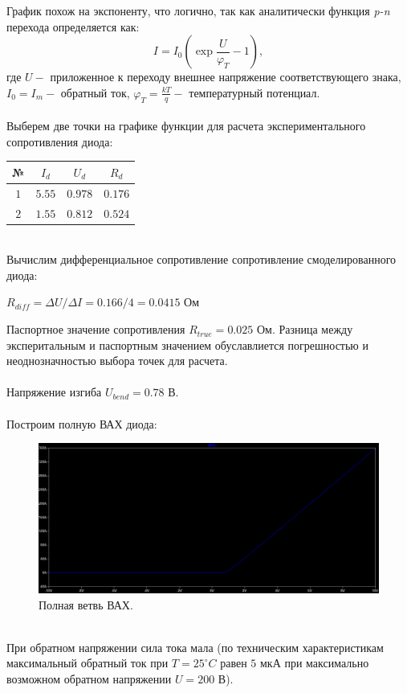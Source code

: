\documentclass[12pt]{article}
\begin{document}
График похож на экспоненту, что логично, так как аналитически функция \emph{p-n} перехода определяется как:
\[
I = I_0(\exp{\frac{U}{\varphi_T}} - 1),
\]
где $U - $ приложенное к переходу внешнее напряжение соответствующего знака, $I_0 = I_m - $ обратный ток, $\varphi_T = \frac{kT}{q} - $ температурный потенциал. \\
\ \\

Выберем две точки на графике функции для расчета экспериментального сопротивления диода:

\begin{center}
    \begin{tabular}{ |c|c|c|c| } 
    \hline
    № & $I_d$ & $U_d$ & $R_d$\\ 
    \hline
    $1$ & $5.55$ & $0.978$ & $0.176$\\
    \hline
    $2$ & $1.55$ & $0.812$ & $0.524$\\
    \hline
    \end{tabular}
\end{center} \\
Вычислим дифференциальное сопротивление сопротивление смоделированного диода:
\begin{center}
    $R_{diff} = \Delta U / \Delta I = 0.166 / 4 = 0.0415$ Ом
\end{center}
Паспортное значение сопротивления $R_{true} = 0.025$ Ом. Разница между эксперитальным и паспортным значением обуславлиется погрешностью и неоднозначностью выбора точек для расчета.\\
\ \\
Напряжение изгиба $U_{bend} = 0.78$ В.\\
\ \\
Построим полную ВАХ диода:
\begin{figure}[H]
    \centering
    \includegraphics[width=\textwidth]{1_2_vac.png}
    \caption{Полная ветвь ВАХ.}
    \label{fig:1_2_vac.png}
\end{figure}\\
При обратном напряжении сила тока мала (по техническим характеристикам максимальный обратный ток при $T = 25 ^\circ C$ равен $5$ мкА при максимально возможном обратном напряжении $U = 200$ В).\\
\end{document}
